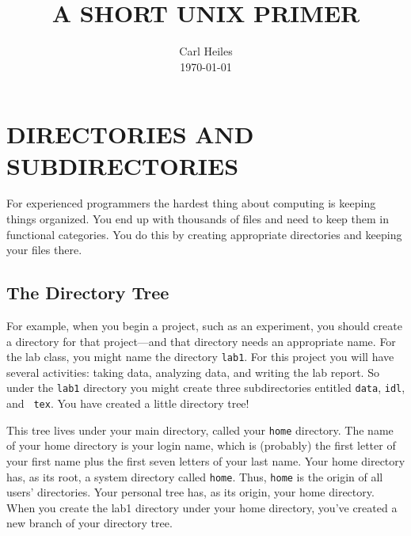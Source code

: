 \documentclass[psfig,preprint]{aastex}
\begin{document}
\title{A SHORT UNIX PRIMER}
\author{Carl Heiles  \\ \today}


\tableofcontents

\section{DIRECTORIES AND SUBDIRECTORIES} \label{directories}

For experienced programmers the hardest thing about computing is keeping
things organized. You end up with thousands of files and need to keep
them in functional categories. You do this by creating appropriate
directories and keeping your files there. 

\subsection{The Directory Tree}\label{thedirtree}

For example, when you begin a project, such as an experiment, you should
create a directory for that project---and that directory needs an
appropriate name. For the lab class, you might name the directory
{\tt lab1}. For this project
you will have several activities: taking data, analyzing data, and
writing the lab report. So under the {\tt lab1} directory you might
create three subdirectories entitled {\tt data}, {\tt idl}, and {\tt
  tex}. You have created a little directory tree!

This tree lives under your main directory, called your {\tt home}
directory. The name of your home directory is your login name, which is
(probably) the first letter of your first name plus the first seven
letters of your last name. Your home directory has, as its root, a
system directory called {\tt home}. Thus, {\tt home} is the origin of
all users' directories. Your personal tree has, as its origin, your home
directory. When you create the lab1 directory under your home directory,
you've created a new branch of your directory tree.
\end{document}
